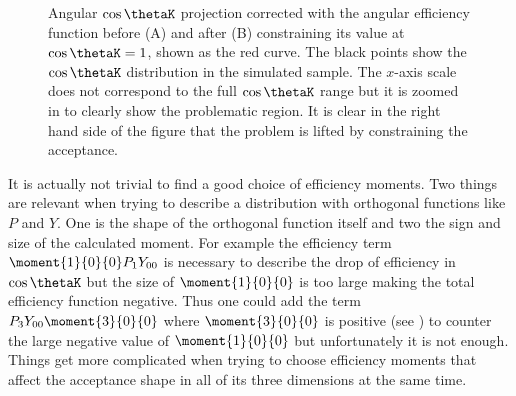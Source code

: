 \begin{figure}[t]
  \centering
  \begin{subfigure}{0.5\textwidth}
    \scalebox{1.15}{}
    \caption{}
    \label{angAcc_nom}
  \end{subfigure}%
  \hfill%
  \begin{subfigure}{0.5\textwidth}
    \scalebox{1.15}{}
    \caption{}
    \label{angAcc_constr_fit}
  \end{subfigure}
  \caption{Angular $\cos\thetaK$ \pdf projection corrected with the angular efficiency function before (A) and after (B) constraining its value at $\cos\thetaK=1$, shown as the red curve.
           The black points show the $\cos\thetaK$ distribution in the simulated sample. The $x$-axis scale does not correspond to the full $\cos\thetaK$ range but it is zoomed in to
           clearly show the problematic region. It is clear in the right hand side of the figure that the problem is lifted by constraining the acceptance.
            }
  \label{angAcc_constr}
\end{figure}

It is actually not trivial to find a good choice of efficiency moments. Two things are relevant when trying to describe a
distribution with orthogonal functions like $P$ and $Y$. One is the shape of the orthogonal function itself and two the sign and size of the calculated moment.
For example the efficiency term $\moment{1}{0}{0}P_1Y_{00}$ is necessary to describe the drop of efficiency in $\cos\thetaK$ but the size of $\moment{1}{0}{0}$
is too large making the total efficiency function negative. Thus one could add the term $P_3Y_{00}\moment{3}{0}{0}$ where $\moment{3}{0}{0}$ is positive
(see  ) to counter the large negative value of $\moment{1}{0}{0}$ but unfortunately it is not enough. Things get more complicated
when trying to choose efficiency moments that affect the acceptance shape in all of its three dimensions at the same time.


